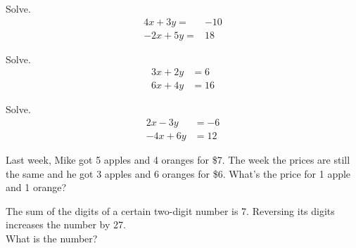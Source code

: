 \begin{exercise}

Solve. \[
\begin{aligned}
    4x+3y=  & -10 \\
    -2x+5y= & 18
\end{aligned}
\]

\end{exercise}
\vspace*{6\baselineskip}

\begin{exercise}

Solve. \[
\begin{aligned}
    3x+2y & =6  \\
    6x+4y & =16
\end{aligned}
\]

\end{exercise}
\vspace*{6\baselineskip}

\begin{exercise}

Solve. \[
\begin{aligned}
    2x-3y  & =-6 \\
    -4x+6y & =12
\end{aligned}
\]

\end{exercise}
\vspace*{6\baselineskip}

\begin{exercise}

Last week, Mike got 5 apples and 4 oranges for \$7. The week the prices
are still the same and he got 3 apples and 6 oranges for \$6. What's the
price for 1 apple and 1 orange?

\end{exercise}
\vspace*{6\baselineskip}

\begin{exercise}

The sum of the digits of a certain two-digit number is 7. Reversing its
digits increases the number by 27.\\
What is the number?

\end{exercise}

